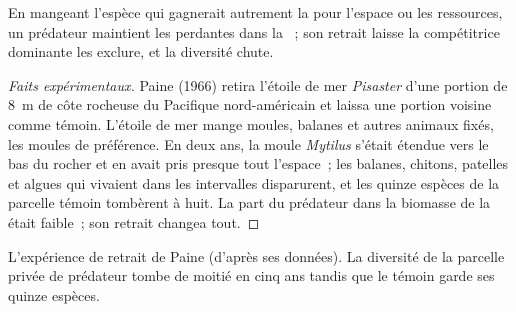 \begin{proposition}\label{prop:b1:species-interactions:paine}
En mangeant l'espèce qui gagnerait autrement la  pour
l'espace ou les ressources, un prédateur maintient les perdantes dans
la ~; son retrait laisse la compétitrice dominante les exclure,
et la diversité chute.
\end{proposition}
\begin{proof}[Faits expérimentaux]
Paine (1966) retira l'étoile de mer \emph{Pisaster} d'une portion de
\qty{8}{m} de côte rocheuse du Pacifique nord-américain et laissa une
portion voisine comme témoin. L'étoile de mer mange moules, balanes et
autres animaux fixés, les moules de préférence. En deux ans, la moule
\emph{Mytilus} s'était étendue vers le bas du rocher et en avait pris
presque tout l'espace~; les balanes, chitons, patelles et algues qui
vivaient dans les intervalles disparurent, et les quinze espèces de la
parcelle témoin tombèrent à huit. La part du prédateur dans la biomasse
de la  était faible~; son retrait changea tout.
\end{proof}

\begin{omfigure}

{\small L'expérience de retrait de Paine (d'après ses données). La
diversité de la parcelle privée de prédateur tombe de moitié en cinq
ans tandis que le témoin garde ses quinze espèces.}
\end{omfigure}

